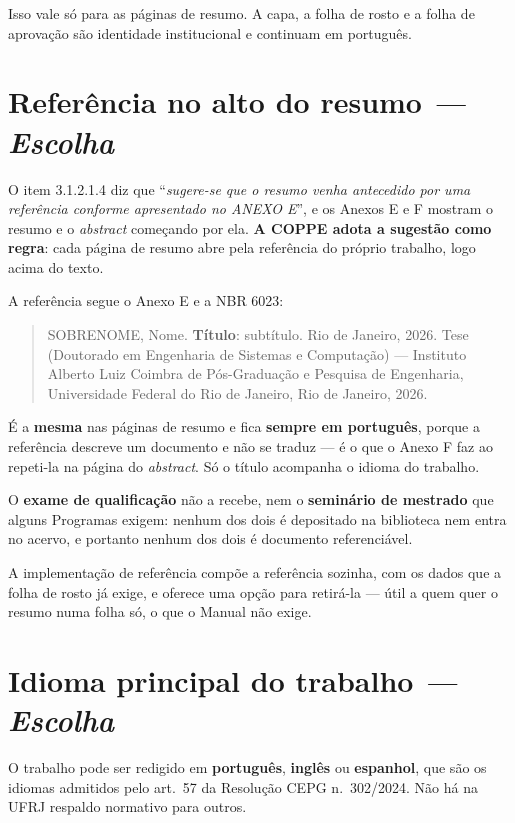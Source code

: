 \documentclass[a4paper,11pt]{article}
\newcommand\tipo[1]{\normalfont\textit{--- #1}}
\begin{document}
Isso vale só para as páginas de resumo. A capa, a folha de rosto e a folha de
aprovação são identidade institucional e continuam em português.

\section{Referência no alto do resumo \tipo{Escolha}}
\label{norma:refresumo}

O item 3.1.2.1.4 diz que ``\textit{sugere-se que o resumo venha antecedido por
uma referência conforme apresentado no ANEXO E}'', e os Anexos E e F mostram o
resumo e o \textit{abstract} começando por ela. \textbf{A COPPE adota a
sugestão como regra}: cada página de resumo abre pela referência do próprio
trabalho, logo acima do texto.

A referência segue o Anexo E e a NBR 6023:

\begin{quote}
SOBRENOME, Nome. \textbf{Título}: subtítulo. Rio de Janeiro, 2026. Tese (Doutorado em
Engenharia de Sistemas e Computação) --- Instituto Alberto Luiz Coimbra de
Pós-Graduação e Pesquisa de Engenharia, Universidade Federal do Rio de
Janeiro, Rio de Janeiro, 2026.
\end{quote}

É a \textbf{mesma} nas páginas de resumo e fica \textbf{sempre em português},
porque a referência descreve um documento e não se traduz --- é o que o Anexo F
faz ao repeti-la na página do \textit{abstract}. Só o título acompanha o
idioma do trabalho.

O \textbf{exame de qualificação} não a recebe, nem o \textbf{seminário de
mestrado} que alguns Programas exigem: nenhum dos dois é depositado na
biblioteca nem entra no acervo, e portanto nenhum dos dois é documento
referenciável.

A implementação de referência compõe a referência sozinha, com os dados que a
folha de rosto já exige, e oferece uma opção para retirá-la --- útil a quem
quer o resumo numa folha só, o que o Manual não exige.

\section{Idioma principal do trabalho \tipo{Escolha}}
\label{norma:idioma}

O trabalho pode ser redigido em \textbf{português}, \textbf{inglês} ou
\textbf{espanhol}, que são os idiomas admitidos pelo art.\ 57 da Resolução CEPG
n.\ 302/2024. Não há na UFRJ respaldo normativo para outros.
\end{document}
